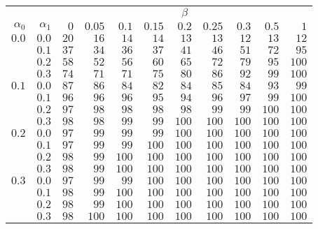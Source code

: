 \begin{tabular}{rr|rrrrrrrrr}
\hline\hline
 && \multicolumn{9}{c}{$\beta$}\\
 $\alpha_0$ & $\alpha_1$ & $0$ & $0.05$ & $0.1$ & $0.15$ & $0.2$ & $0.25$ & $0.3$ & $0.5$ & $1$ \\ 
 \hline
$0.0$ & $0.0$ & $20$ & $16$ & $14$ & $14$ & $13$ & $13$ & $12$ & $13$ & $12$\\ 
 & $0.1$ & $37$ & $34$ & $36$ & $37$ & $41$ & $46$ & $51$ & $72$ & $95$\\ 
 & $0.2$ & $58$ & $52$ & $56$ & $60$ & $65$ & $72$ & $79$ & $95$ & $100$\\ 
 & $0.3$ & $74$ & $71$ & $71$ & $75$ & $80$ & $86$ & $92$ & $99$ & $100$\\ 
\hline 
 $0.1$ & $0.0$ & $87$ & $86$ & $84$ & $82$ & $84$ & $85$ & $84$ & $93$ & $99$\\ 
 & $0.1$ & $96$ & $96$ & $96$ & $95$ & $94$ & $96$ & $97$ & $99$ & $100$\\ 
 & $0.2$ & $97$ & $98$ & $98$ & $98$ & $98$ & $99$ & $99$ & $100$ & $100$\\ 
 & $0.3$ & $98$ & $98$ & $99$ & $99$ & $100$ & $100$ & $100$ & $100$ & $100$\\ 
\hline 
 $0.2$ & $0.0$ & $97$ & $99$ & $99$ & $99$ & $100$ & $100$ & $100$ & $100$ & $100$\\ 
 & $0.1$ & $97$ & $99$ & $99$ & $100$ & $100$ & $100$ & $100$ & $100$ & $100$\\ 
 & $0.2$ & $98$ & $99$ & $100$ & $100$ & $100$ & $100$ & $100$ & $100$ & $100$\\ 
 & $0.3$ & $98$ & $99$ & $100$ & $100$ & $100$ & $100$ & $100$ & $100$ & $100$\\ 
\hline 
 $0.3$ & $0.0$ & $97$ & $99$ & $99$ & $100$ & $100$ & $100$ & $100$ & $100$ & $100$\\ 
 & $0.1$ & $98$ & $99$ & $100$ & $100$ & $100$ & $100$ & $100$ & $100$ & $100$\\ 
 & $0.2$ & $98$ & $99$ & $100$ & $100$ & $100$ & $100$ & $100$ & $100$ & $100$\\ 
 & $0.3$ & $98$ & $100$ & $100$ & $100$ & $100$ & $100$ & $100$ & $100$ & $100$\\ 
 \hline 
 \end{tabular}